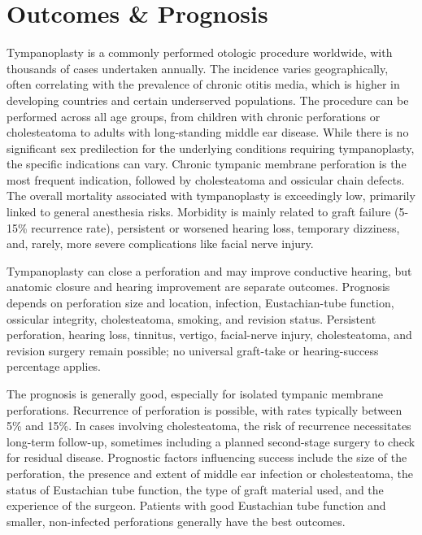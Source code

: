 \section*{Outcomes \& Prognosis}
Tympanoplasty is a commonly performed otologic procedure worldwide, with thousands of cases undertaken annually. The incidence varies geographically, often correlating with the prevalence of chronic otitis media, which is higher in developing countries and certain underserved populations. The procedure can be performed across all age groups, from children with chronic perforations or cholesteatoma to adults with long-standing middle ear disease. While there is no significant sex predilection for the underlying conditions requiring tympanoplasty, the specific indications can vary. Chronic tympanic membrane perforation is the most frequent indication, followed by cholesteatoma and ossicular chain defects. The overall mortality associated with tympanoplasty is exceedingly low, primarily linked to general anesthesia risks. Morbidity is mainly related to graft failure (5-15\% recurrence rate), persistent or worsened hearing loss, temporary dizziness, and, rarely, more severe complications like facial nerve injury.

Tympanoplasty can close a perforation and may improve conductive hearing, but anatomic closure and hearing improvement are separate outcomes. Prognosis depends on perforation size and location, infection, Eustachian-tube function, ossicular integrity, cholesteatoma, smoking, and revision status. Persistent perforation, hearing loss, tinnitus, vertigo, facial-nerve injury, cholesteatoma, and revision surgery remain possible; no universal graft-take or hearing-success percentage applies.

The prognosis is generally good, especially for isolated tympanic membrane perforations. Recurrence of perforation is possible, with rates typically between 5\% and 15\%. In cases involving cholesteatoma, the risk of recurrence necessitates long-term follow-up, sometimes including a planned second-stage surgery to check for residual disease. Prognostic factors influencing success include the size of the perforation, the presence and extent of middle ear infection or cholesteatoma, the status of Eustachian tube function, the type of graft material used, and the experience of the surgeon. Patients with good Eustachian tube function and smaller, non-infected perforations generally have the best outcomes.

